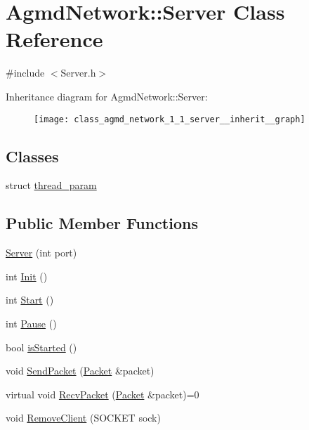 \hypertarget{class_agmd_network_1_1_server}{\section{Agmd\+Network\+:\+:Server Class Reference}
\label{class_agmd_network_1_1_server}
}


{\ttfamily \#include $<$Server.\+h$>$}



Inheritance diagram for Agmd\+Network\+:\+:Server\+:\nopagebreak
\begin{figure}[H]
\begin{center}
\leavevmode
\texttt{[image: class\_agmd\_network\_1\_1\_server\_\_inherit\_\_graph]}
\end{center}
\end{figure}
\subsection*{Classes}
\begin{DoxyCompactItemize}
\item 
struct \hyperlink{struct_agmd_network_1_1_server_1_1thread__param}{thread\+\_\+param}
\end{DoxyCompactItemize}
\subsection*{Public Member Functions}
\begin{DoxyCompactItemize}
\item 
\hyperlink{class_agmd_network_1_1_server_abe7fee464a83053160a5fa3582edbe0e}{Server} (int port)
\item 
int \hyperlink{class_agmd_network_1_1_server_aaa22556f45862d01defd56405fb3f8f9}{Init} ()
\item 
int \hyperlink{class_agmd_network_1_1_server_ab2ae12e4bc684bb19eba1601bb6a90d5}{Start} ()
\item 
int \hyperlink{class_agmd_network_1_1_server_ae406babf7e440f99f010d60c95f29a8b}{Pause} ()
\item 
bool \hyperlink{class_agmd_network_1_1_server_a5413800e8d5dd1b5483f910c6163d5e7}{is\+Started} ()
\item 
void \hyperlink{class_agmd_network_1_1_server_a7144d57c804d9a4aa5dae4d83011d1b0}{Send\+Packet} (\hyperlink{class_agmd_network_1_1_packet}{Packet} \&packet)
\item 
virtual void \hyperlink{class_agmd_network_1_1_server_afb8e79ab1d6e342cbdd301ae60fd185d}{Recv\+Packet} (\hyperlink{class_agmd_network_1_1_packet}{Packet} \&packet)=0
\item 
void \hyperlink{class_agmd_network_1_1_server_aa462f1e230f1d3961db3f847703ecc34}{Remove\+Client} (S\+O\+C\+K\+E\+T sock)
\end{DoxyCompactItemize}
